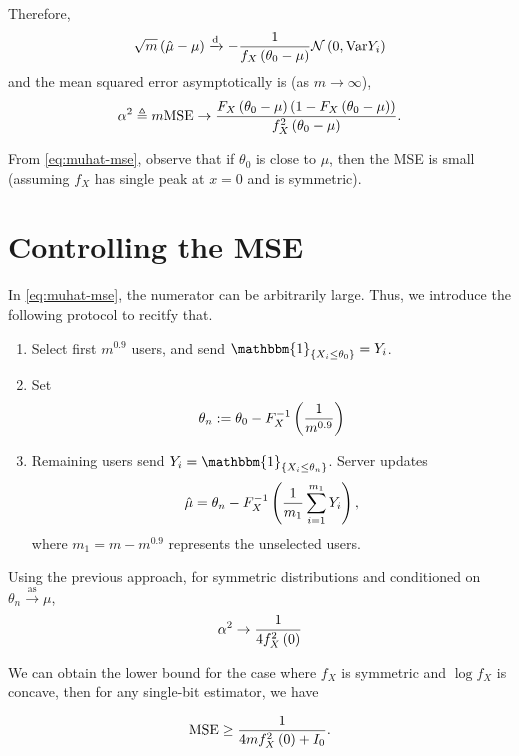 \documentclass[twoside]{article}
\begin{document}
Therefore,
\begin{equation}
    \sqrt{m}\left(\hat{\mu}-\mu\right) \xrightarrow{\mathrm{d}} -\frac{1}{f_X\left(\theta_0-\mu\right)}\mathcal N\left(0,\mathrm{Var}{Y_i}\right)
    \label{eq:muhat-dconv}
\end{equation}
and the mean squared error asymptotically is (as \(m\to\infty\)),
\begin{equation}
    \alpha^2 \triangleq m\mathrm{MSE} \to \frac{F_X\left(\theta_0-\mu\right)\left(1-F_X\left(\theta_0-\mu\right)\right)}{f_X^2\left(\theta_0-\mu\right)}.
    \label{eq:muhat-mse}
\end{equation}

From \eqref{eq:muhat-mse}, observe that if \(\theta_0\) is close to \(\mu\), 
then the MSE is small (assuming \(f_X\) has single peak at \(x = 0\) and is 
symmetric). 

\section{Controlling the MSE}

In \eqref{eq:muhat-mse}, the numerator can be arbitrarily large. Thus, we
introduce the following protocol to recitfy that.

\begin{enumerate}
    \item Select first \(m^{0.9}\) users, and send \(\mathbbm{1}_{\cbrak{X_i\le\theta_0}} = Y_i\).
    \item Set
    \begin{equation}
        \theta_n := \theta_0 - F_X^{-1}\left(\frac{1}{m^{0.9}}\right)
    \end{equation}
    \item Remaining users send \(Y_i = \mathbbm{1}_{\cbrak{X_i\le\theta_n}}\).
    Server updates
    \begin{equation}
        \hat{\mu} = \theta_n - F_X^{-1}\left(\frac{1}{m_1}\sum_{i=1}^{m_1}Y_i\right),
        \label{eq:srv-upd-dme}
    \end{equation}
    where \(m_1 = m - m^{0.9}\) represents the unselected users.
\end{enumerate}

Using the previous approach, for symmetric distributions and conditioned on
\(\theta_n \xrightarrow{\mathrm{as}} \mu\),
\begin{equation}
    \alpha^2 \to \frac{1}{4f_X^2\left(0\right)}
\end{equation}

We can obtain the lower bound for the case where \(f_X\) is symmetric and
\(\log{f_X}\) is concave, then for any single-bit estimator, we have

\begin{equation}
    \mathrm{MSE} \ge \frac{1}{4mf_X^2\left(0\right) + I_0}.
    \label{eq:mse-lb-concave}
\end{equation}
\end{document}
